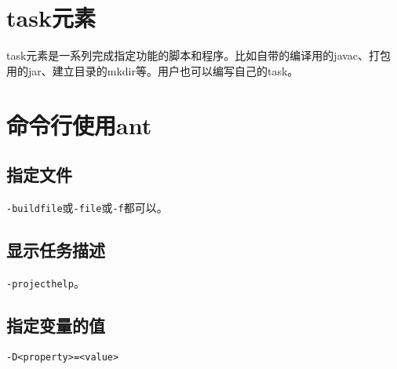 	

\section{task元素}
	
	task元素是一系列完成指定功能的脚本和程序。比如自带的编译用的javac、打包用的jar、建立目录的mkdir等。用户也可以编写自己的task。


\section{命令行使用ant}

	\subsection{指定文件}

		\verb|-buildfile|或\verb|-file|或\verb|-f|都可以。

	\subsection{显示任务描述}

		\verb|-projecthelp|。

	\subsection{指定变量的值}

		\verb|-D<property>=<value>|

